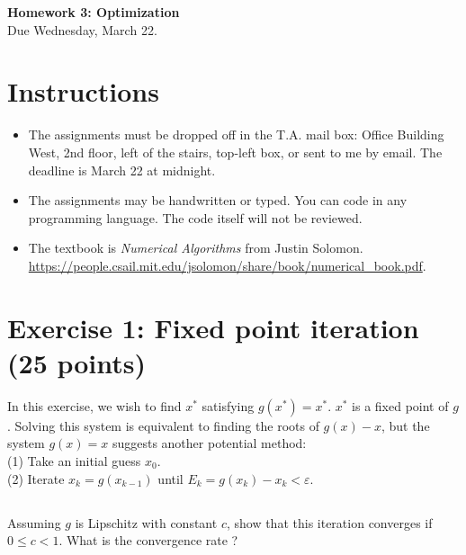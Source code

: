 


\begin{center}
{\large\textbf{Homework 3: Optimization}}\\
Due Wednesday, March 22.
\end{center}

\noindent\makebox[\linewidth]{\rule{\linewidth}{0.6pt}}
 
\section*{Instructions}

\begin{itemize}
\item The assignments must be dropped off in the T.A. mail box: Office Building West, 2nd floor, left of the stairs, top-left box, or sent to me by email. The deadline is March 22  at midnight.
\item The assignments may be handwritten or typed. You can code in any programming language. The code itself will not be reviewed. 
\item The textbook is \emph{Numerical Algorithms} from Justin Solomon.\\ \url{https://people.csail.mit.edu/jsolomon/share/book/numerical_book.pdf}.  
\end{itemize}



\noindent\makebox[\linewidth]{\rule{\linewidth}{0.6pt}}

\section*{Exercise 1:  Fixed point iteration \normalsize \textnormal(25 points)}

In this exercise, we wish to find $x^*$ satisfying $g(x^*) = x^*$. $x^*$ is a fixed point of $g$. Solving this system is equivalent to finding the roots of $g(x) - x$, but the system $g(x) = x$ suggests another potential method:\\
(1) Take an initial guess $x_0$.\\
(2) Iterate $x_k = g(x_{k-1})$ until $E_k = g(x_k) - x_k < \varepsilon$. 

\subsection{} Assuming $g$ is Lipschitz with constant $c$, show that this iteration converges if $0 \leq c < 1$. What is the convergence rate ?

